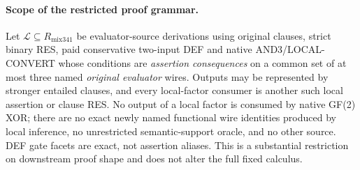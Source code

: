 \documentclass[11pt]{article}
\begin{document}
\paragraph{Scope of the restricted proof grammar.} Let \(\mathcal L\subseteq R_{\mathrm{mix341}}\) be evaluator-source derivations using original clauses, strict binary RES, paid conservative two-input DEF and native AND3/LOCAL-CONVERT whose conditions are \emph{assertion consequences} on a common set of at most three named \emph{original evaluator} wires. Outputs may be represented by stronger entailed clauses, and every local-factor consumer is another such local assertion or clause RES. No output of a local factor is consumed by native GF(2) XOR; there are no exact newly named functional wire identities produced by local inference, no unrestricted semantic-support oracle, and no other source. DEF gate facets are exact, not assertion aliases. This is a substantial restriction on downstream proof shape and does not alter the full fixed calculus.
\end{document}
